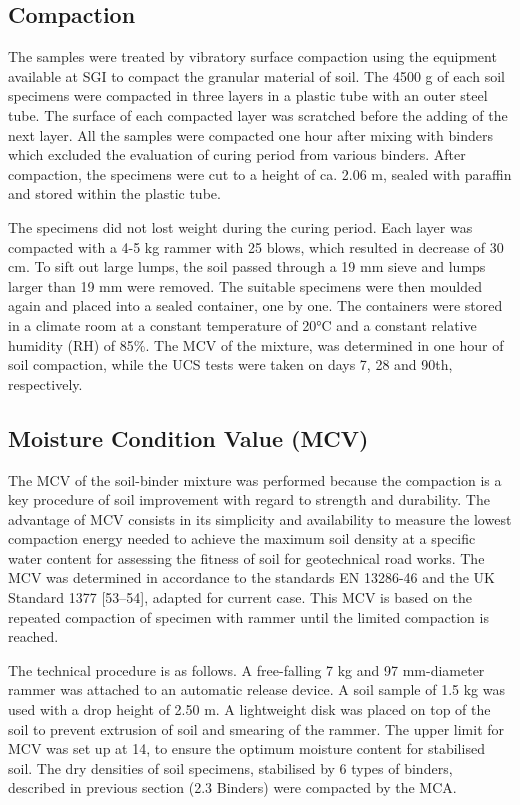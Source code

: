 \documentclass[electronics,article,submit,pdftex,moreauthors]{Definitions/mdpi}
\begin{document}
\subsection{Compaction}
The samples were treated by vibratory surface compaction using the equipment available at SGI to compact the granular material of soil. The 4500 g of each soil specimens were compacted in three layers in a plastic tube with an outer steel tube. The surface of each compacted layer was scratched before the adding of the next layer. All the samples were compacted one hour after mixing with binders which excluded the evaluation of curing period from various binders. After compaction, the specimens were cut to a height of ca. 2.06 m, sealed with paraffin and stored within the plastic tube. 

The specimens did not lost weight during the curing period. Each layer was compacted with a 4-5 kg rammer with 25 blows, which resulted in decrease of 30 cm. To sift out large lumps, the soil passed through a 19 mm sieve and lumps larger than 19 mm were removed. The suitable specimens were then moulded again and placed into a sealed container, one by one. The containers were stored in a climate room at a constant temperature of 20°C and a constant relative humidity (RH) of 85\%. The MCV of the mixture, was determined in one hour of soil compaction, while the UCS tests were taken on days 7, 28 and 90th, respectively. 

\subsection{Moisture Condition Value (MCV)}
The MCV of the soil-binder mixture was performed because the compaction is a key procedure of soil improvement with regard to strength and durability. The advantage of MCV consists in its simplicity and availability to measure the lowest compaction energy needed to achieve the maximum soil density at a specific water content for assessing the fitness of soil for geotechnical road works. The MCV was determined in accordance to the standards EN 13286-46 and the UK Standard 1377 [53–54], adapted for current case. This MCV is based on the repeated compaction of specimen with rammer until the limited compaction is reached. 

The technical procedure is as follows. A free-falling 7 kg and 97 mm-diameter rammer was attached to an automatic release device. A soil sample of 1.5 kg was used with a drop height of 2.50 m. A lightweight disk was placed on top of the soil to prevent extrusion of soil and smearing of the rammer. The upper limit for MCV was set up at 14, to ensure the optimum moisture content for stabilised soil. The dry densities of soil specimens, stabilised by 6 types of binders, described in previous section (2.3 Binders) were compacted by the MCA. 
\end{document}
